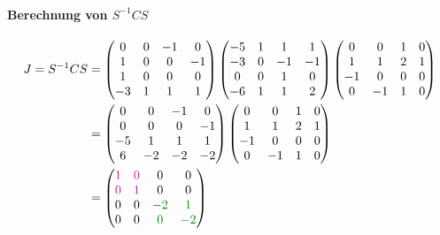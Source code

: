 \documentclass{article}
\begin{document}
\paragraph{Berechnung von $S^{-1}CS$}
\begin{align*}
J = S^{-1}CS &= \mat{0&0&-1&0\\1&0&0&-1\\1&0&0&0\\-3&1&1&1}\mat{-5&1&1&1\\-3&0&-1&-1\\0&0&1&0\\-6&1&1&2}\mat{0&0&1&0\\1&1&2&1\\-1&0&0&0\\0&-1&1&0}\\
&= \mat{0&0&-1&0\\0&0&0&-1\\-5&1&1&1\\6&-2&-2&-2}\mat{0&0&1&0\\1&1&2&1\\-1&0&0&0\\0&-1&1&0}\\
&= \mat{{\color{MediumVioletRed}1}&{\color{MediumVioletRed}0}&0&0\\{\color{MediumVioletRed}0}&{\color{MediumVioletRed}1}&0&0\\0&0&{\color{Green}-2}&{\color{Green}1}\\0&0&{\color{Green}0}&{\color{Green}-2}}
\end{align*}
\end{document}
